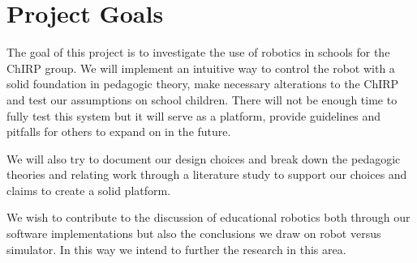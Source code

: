 \section{Project Goals}
The goal of this project is to investigate the use of robotics in schools for the ChIRP group. We will implement an intuitive way to control the robot with a solid foundation in pedagogic theory, make necessary alterations to the ChIRP and test our assumptions on school children. There will not be enough time to fully test this system but it will serve as a platform, provide guidelines and pitfalls for others to expand on in the future. 

\bigskip\noindent
We will also try to document our design choices and break down the pedagogic theories and relating work through a literature study to support our choices and claims to create a solid platform. 

\bigskip\noindent
We wish to contribute to the discussion of educational robotics both through our software implementations but also the conclusions we draw on robot versus simulator. In this way we intend to further the research in this area. 
